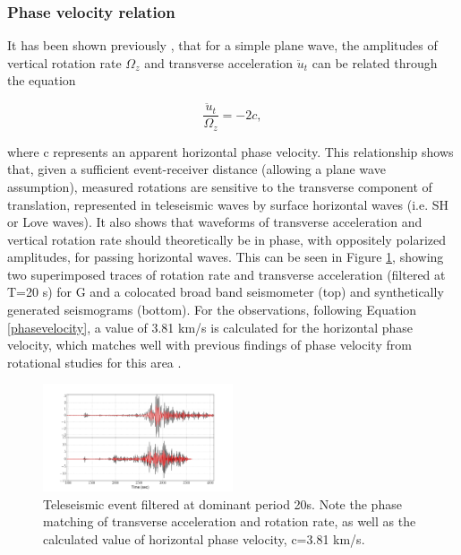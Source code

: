 \documentclass{gji}
\begin{document}
\subsubsection{Phase velocity relation}\label{phasevel}
It has been shown previously \cite{igel2005rotational},
that for a simple plane wave, the amplitudes of vertical rotation rate $\Omega_z$  and transverse acceleration $\ddot{u}_t$ can be related through the equation 

\begin{equation}\label{phasevelocity}
	\frac{\ddot{u}_t}{\Omega_z} = -2c,
\end{equation}

\noindent where c represents an apparent horizontal phase velocity. This relationship shows that, given a sufficient event-receiver distance (allowing a plane wave assumption), measured rotations are sensitive to the transverse component of translation, represented in teleseismic waves by surface horizontal waves (i.e. SH or Love waves). It also shows that waveforms of transverse acceleration and vertical rotation rate should theoretically be in phase, with oppositely polarized amplitudes, for passing horizontal waves. This can be seen in Figure \ref{fig:rr_ta}, showing two superimposed traces of rotation rate and transverse acceleration (filtered at T=20 s) for G and a colocated broad band seismometer (top) and synthetically generated seismograms (bottom). For the observations, following Equation \ref{phasevelocity}, a value of 3.81 km/s is calculated for the horizontal phase velocity, which matches well with previous findings of phase velocity from rotational studies for this area \cite{igel2007broad}.



\begin{figure}
\centerline{\includegraphics[width=0.5\textwidth]{rr_ta}}
\caption{Teleseismic event filtered at dominant period 20s. Note the phase matching of transverse acceleration and rotation rate, as well as the calculated value of horizontal phase velocity, c=3.81 km/s.}
\label{fig:rr_ta}
\end{figure}
\end{document}
